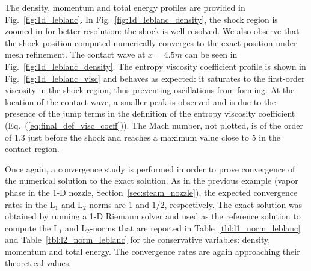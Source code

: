 \documentclass[review,10pt]{elsarticle}
\newcommand{\eqt}[1]{Eq.~(\ref{#1})}                     %
\newcommand{\fig}[1]{Fig.~\ref{#1}}                      %
\newcommand{\tbl}[1]{Table~\ref{#1}}                     %
\newcommand{\sct}[1]{Section~\ref{#1}}                   %
\begin{document}
%
The density, momentum and total energy profiles are provided in \fig{fig:1d_leblanc}. In \fig{fig:1d_leblanc_density}, 
the shock region is zoomed in for better resolution: the shock is well resolved. We also observe that the shock 
position computed numerically converges to the exact position under mesh refinement. The contact wave at $x=4.5m$ 
can be seen in \fig{fig:1d_leblanc_density}. The entropy viscosity coefficient profile is shown in 
\fig{fig:1d_leblanc_visc} and behaves as expected: it saturates to the first-order viscosity in the 
shock region, thus preventing oscillations from forming. At the location of the contact wave, a 
smaller peak is observed and is due to the presence of the jump terms in the definition of the entropy 
viscosity coefficient (\eqt{eq:final_def_visc_coeff}).  The Mach number, not plotted, is of the order 
of $1.3$ just before the shock and reaches a maximum value close to $5$ in the contact region.

Once again, a convergence study is performed in order to prove convergence of the numerical solution to 
the exact solution. As in the previous example (vapor phase in the 1-D nozzle, \sct{sec:steam_nozzle}), 
the expected convergence rates in the L$_1$ and L$_2$ norms are 1 and $1/2$, respectively. The exact 
solution was obtained by running a 1-D Riemann solver and used as the reference solution to compute 
the L$_1$ and L$_2$-norms that are reported in \tbl{tbl:l1_norm_leblanc} and \tbl{tbl:l2_norm_leblanc} 
for the conservative variables: density, momentum and total energy. The convergence rates are again approaching their theoretical values.
\end{document}
